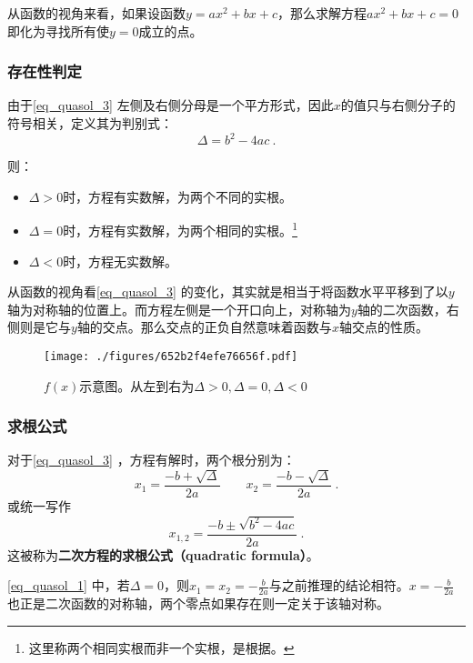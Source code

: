 从函数的视角来看，如果设函数$y=ax^2+bx+c$，那么求解方程$ax^2+bx+c=0$即化为寻找所有使$y=0$成立的点。

\subsubsection{存在性判定}

由于\autoref{eq_quasol_3} 左侧及右侧分母是一个平方形式，因此$x$的值只与右侧分子的符号相关，定义其为判别式：
\begin{equation}
\Delta = b^2-4ac~.
\end{equation}

则：
\begin{itemize}
\item $\Delta > 0$时，方程有实数解，为两个不同的实根。
\item $\Delta = 0$时，方程有实数解，为两个相同的实根。\footnote{这里称两个相同实根而非一个实根，是根据。}
\item $\Delta < 0$时，方程无实数解。
\end{itemize}

从函数的视角看\autoref{eq_quasol_3} 的变化，其实就是相当于将函数水平平移到了以$y$轴为对称轴的位置上。而方程左侧是一个开口向上，对称轴为$y$轴的二次函数，右侧则是它与$y$轴的交点。那么交点的正负自然意味着函数与$x$轴交点的性质。

\begin{figure}[ht]
\centering
\texttt{[image: ./figures/652b2f4efe76656f.pdf]}
\caption{$f(x)$示意图。从左到右为$\Delta > 0, \Delta = 0, \Delta < 0$} \label{fig_quasol_1}
\end{figure}

\subsubsection{求根公式}

对于\autoref{eq_quasol_3} ，方程有解时，两个根分别为：
\begin{equation}\label{eq_quasol_1}
x_1=\frac{-b+\sqrt{\Delta}}{2a}\qquad x_2=\frac{-b-\sqrt{\Delta}}{2a}~.
\end{equation}
或统一写作
\begin{equation}
x_{1,2} = \frac{-b \pm \sqrt{b^2 - 4ac}}{2a}~.
\end{equation}
这被称为\textbf{二次方程的求根公式（quadratic formula）}。

\autoref{eq_quasol_1} 中，若$\Delta = 0$，则$\displaystyle x_1=x_2=-\frac{b}{2a}$与之前推理的结论相符。$\displaystyle x=-\frac{b}{2a}$也正是二次函数的对称轴，两个零点如果存在则一定关于该轴对称。



